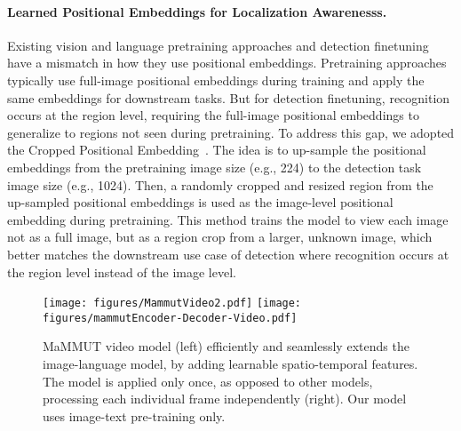 \documentclass[10pt]{article} \usepackage[accepted]{tmlr}
\newcommand{\ours}{MaMMUT\xspace}
\begin{document}
\paragraph{Learned Positional Embeddings for Localization Awarenesss.}\quad
Existing vision and language pretraining approaches and detection finetuning have a mismatch in how they use positional embeddings. Pretraining approaches typically use full-image positional embeddings during training and apply the same embeddings for downstream tasks. But for detection finetuning, recognition occurs at the region level, requiring the full-image positional embeddings to generalize to regions not seen during pretraining. 
To address this gap, we adopted the Cropped Positional Embedding~\citep{rovit}. The idea is to up-sample the positional embeddings from the pretraining image size (e.g., 224) to the detection task image size (e.g., 1024). Then, a randomly cropped and resized region from the up-sampled positional embeddings is used as the image-level positional embedding during pretraining. This method trains the model to view each image not as a full image, but as a region crop from a larger, unknown image, which better matches the downstream use case of detection where recognition occurs at the region level instead of the image level.


\begin{figure}
    \centering
     \vspace{-0.7cm}
    \texttt{[image: figures/MammutVideo2.pdf]}
\hspace{0.5cm}
\texttt{[image: figures/mammutEncoder-Decoder-Video.pdf]}
     \vspace{-0.2cm}
    \caption{\ours video model (left) efficiently and seamlessly extends the image-language model, by adding learnable spatio-temporal features. The model is applied only once, as opposed to other models, processing each individual frame independently (right). Our model uses image-text pre-training only. }
    \label{fig:video_arch}
\end{figure}
\end{document}
